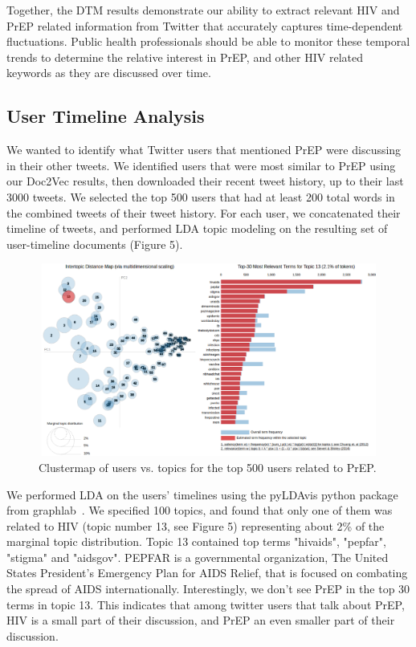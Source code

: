 \documentclass{sig-alternate-05-2015}
\begin{document}
Together, the DTM results demonstrate our ability to extract relevant HIV and PrEP related information from Twitter that accurately captures time-dependent fluctuations. Public health professionals should be able to monitor these temporal trends to determine the relative interest in PrEP, and other HIV related keywords as they are discussed over time.

\subsection{User Timeline Analysis}

We wanted to identify what Twitter users that mentioned PrEP were discussing in their other tweets. We identified users that were most similar to PrEP using our Doc2Vec results, then downloaded their recent tweet history, up to their last 3000 tweets. We selected the top 500 users that had at least 200 total words in the combined tweets of their tweet history. For each user, we concatenated their timeline of tweets, and performed LDA topic modeling on the resulting set of user-timeline documents (Figure 5).

\begin{figure}
\centering
\includegraphics[height=2.5in, width=5in]{LDA_user_timelines}
\caption{Clustermap of users vs. topics for the top 500 users related to PrEP.}
\end{figure}

We performed LDA on the users' timelines using the pyLDAvis python package from graphlab~\cite{low2014graphlab}. We specified 100 topics, and found that only one of them was related to HIV (topic number 13, see Figure 5) representing about 2\% of the marginal topic distribution. Topic 13 contained top terms "hivaids", "pepfar", "stigma" and "aidsgov". PEPFAR is a governmental organization, The United States President's Emergency Plan for AIDS Relief, that is focused on combating the spread of AIDS internationally. Interestingly, we don't see PrEP in the top 30 terms in topic 13. This indicates that among twitter users that talk about PrEP, HIV is a small part of their discussion, and PrEP an even smaller part of their discussion.
\end{document}

